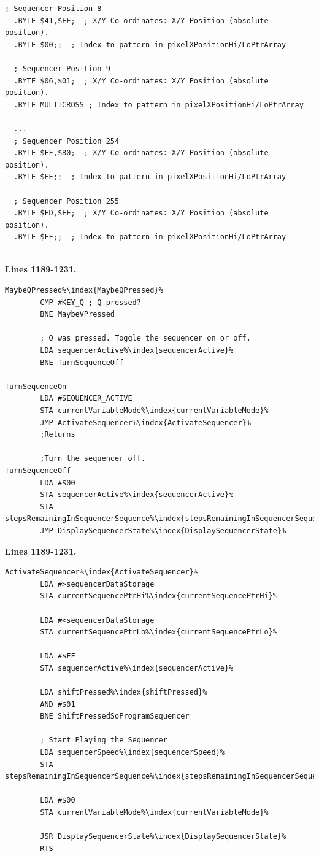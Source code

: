 \begin{lstlisting}[basicstyle=\ttfamily\scriptsize,caption=Sequencer definition in \icode{sequencer\_data.asm}.,escapechar=\%]
  ; Sequencer Position 8
  .BYTE $41,$FF;  ; X/Y Co-ordinates: X/Y Position (absolute position).   
  .BYTE $00;;  ; Index to pattern in pixelXPositionHi/LoPtrArray   

  ; Sequencer Position 9
  .BYTE $06,$01;  ; X/Y Co-ordinates: X/Y Position (absolute position).   
  .BYTE MULTICROSS ; Index to pattern in pixelXPositionHi/LoPtrArray   

  ...
  ; Sequencer Position 254
  .BYTE $FF,$80;  ; X/Y Co-ordinates: X/Y Position (absolute position).   
  .BYTE $EE;;  ; Index to pattern in pixelXPositionHi/LoPtrArray   

  ; Sequencer Position 255
  .BYTE $FD,$FF;  ; X/Y Co-ordinates: X/Y Position (absolute position).   
  .BYTE $FF;;  ; Index to pattern in pixelXPositionHi/LoPtrArray   
    
\end{lstlisting}

\clearpage
\textbf{Lines 1189-1231. }
\begin{lstlisting}[escapechar=\%]
MaybeQPressed%\index{MaybeQPressed}%    
        CMP #KEY_Q ; Q pressed?
        BNE MaybeVPressed

        ; Q was pressed. Toggle the sequencer on or off.
        LDA sequencerActive%\index{sequencerActive}%
        BNE TurnSequenceOff

TurnSequenceOn
        LDA #SEQUENCER_ACTIVE
        STA currentVariableMode%\index{currentVariableMode}%
        JMP ActivateSequencer%\index{ActivateSequencer}%
        ;Returns

        ;Turn the sequencer off.
TurnSequenceOff   
        LDA #$00
        STA sequencerActive%\index{sequencerActive}%
        STA stepsRemainingInSequencerSequence%\index{stepsRemainingInSequencerSequence}%
        JMP DisplaySequencerState%\index{DisplaySequencerState}%
\end{lstlisting}
\textbf{Lines 1189-1231. }
\begin{lstlisting}[escapechar=\%]
ActivateSequencer%\index{ActivateSequencer}% 
        LDA #>sequencerDataStorage
        STA currentSequencePtrHi%\index{currentSequencePtrHi}%

        LDA #<sequencerDataStorage
        STA currentSequencePtrLo%\index{currentSequencePtrLo}%

        LDA #$FF
        STA sequencerActive%\index{sequencerActive}%

        LDA shiftPressed%\index{shiftPressed}%
        AND #$01
        BNE ShiftPressedSoProgramSequencer

        ; Start Playing the Sequencer
        LDA sequencerSpeed%\index{sequencerSpeed}%
        STA stepsRemainingInSequencerSequence%\index{stepsRemainingInSequencerSequence}%

        LDA #$00
        STA currentVariableMode%\index{currentVariableMode}%

        JSR DisplaySequencerState%\index{DisplaySequencerState}%
        RTS 
\end{lstlisting}
\clearpage

